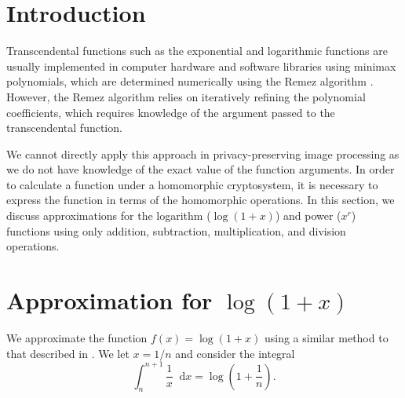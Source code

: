 \section{Introduction}
\newcommand*\diff{\mathop{}\!\mathrm{d}}

Transcendental functions such as the exponential and logarithmic functions are usually implemented in computer hardware and software libraries using minimax polynomials, which are determined numerically using the Remez algorithm \cite{harrison_computation_1999}.
However, the Remez algorithm relies on iteratively refining the polynomial coefficients, which requires knowledge of the argument passed to the transcendental function.

We cannot directly apply this approach in privacy-preserving image processing as we do not have knowledge of the exact value of the function arguments. In order to calculate a function under a  homomorphic cryptosystem, it is necessary to express the function in terms of the homomorphic operations.
In this section, we discuss approximations for the logarithm ($\log(1+x)$) and power ($x^r$) functions using only addition, subtraction, multiplication, and division operations.

\section{Approximation for $\log(1+x)$}
\label{sec:logapproximation}
We approximate the function $f(x)=\log(1+x)$ using a similar method to that described in
\cite{khattri_new_2009}.
We let $x = 1/n$ and consider the integral
\begin{equation}
	\label{eq:log_integral}
  	\int_{n}^{n+1}{\frac{1}{x}\diff x}=\log{\left(1+\frac{1}{n}\right)}.
\end{equation}

